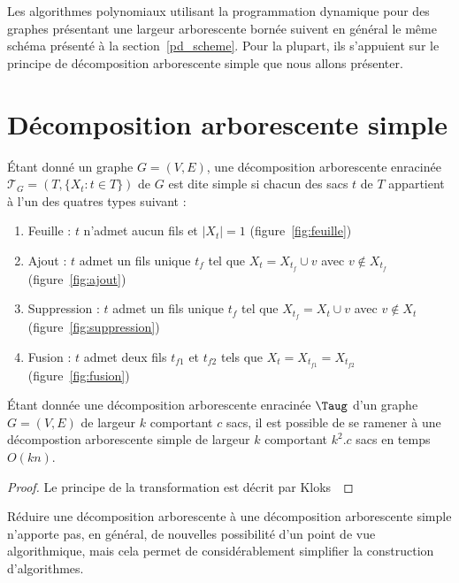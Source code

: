 Les algorithmes polynomiaux utilisant la programmation dynamique pour des graphes présentant une
largeur arborescente bornée suivent en général le même schéma présenté à la
section~\ref{pd_scheme}. Pour la plupart, ils s'appuient sur le principe de décomposition
arborescente simple que nous allons présenter.

\section{Décomposition arborescente simple}

\begin{ndf}
    Étant donné un graphe $G=(V,E)$, une décomposition arborescente enracinée $\mathcal{T}_G = (T,
    \{X_t : t \in T\})$ de $G$ est dite simple si chacun des sacs $t$ de $T$ appartient à l'un des
    quatres types suivant :
    \begin{enumerate}
        \item Feuille : $t$ n'admet aucun fils et $|X_t| = 1$ (figure~\ref{fig:feuille})
        \item Ajout : $t$ admet un fils unique $t_f$ tel que $X_t = X_{t_f} \cup v$ avec $v \not
            \in X_{t_f}$ (figure~\ref{fig:ajout})
        \item Suppression : $t$ admet un fils unique $t_f$ tel que $X_{t_f} = X_t \cup v$ avec $v
            \not \in X_t$ (figure~\ref{fig:suppression}) 
        \item Fusion : $t$ admet deux fils $t_{f1}$ et $t_{f2}$ tels que $X_t = X_{t_{f1}} =
            X_{t_{f2}}$ (figure~\ref{fig:fusion})
    \end{enumerate}
\end{ndf}

\begin{nthrm}
    Étant donnée une décomposition arborescente enracinée $\Taug$ d'un graphe $G=(V,E)$ de largeur
    $k$ comportant $c$ sacs, il est possible de se ramener à une décompostion arborescente simple de
    largeur $k$ comportant $k^2.c$ sacs en temps $O(kn)$.
\end{nthrm}

\begin{proof}
    Le principe de la transformation est décrit par Kloks~\cite{klo94}
\end{proof}

Réduire une décomposition arborescente à une décomposition arborescente simple n'apporte pas, en
général, de nouvelles possibilité d'un point de vue algorithmique, mais cela permet de
considérablement simplifier la construction d'algorithmes.

